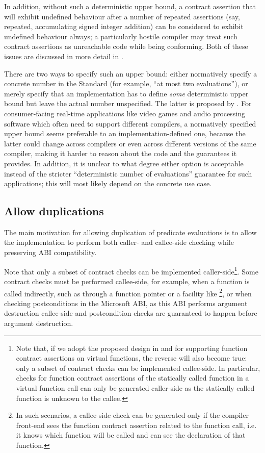 In addition, without such a deterministic upper bound, a contract assertion that will exhibit undefined behaviour after a number of repeated assertions (say, repeated, accumulating signed integer addition) can be considered to exhibit undefined behaviour always; a particularly hostile compiler may treat such contract assertions as unreachable code while being conforming. Both of these issues are discussed in more detail in \cite{P3119R0}.

There are two ways to specify such an upper bound: either normatively specify a concrete number in the Standard (for example, ``at most two evaluations''), or merely specify that an implementation has to define \emph{some} deterministic upper bound but leave the actual number unspecified. The latter is proposed by \cite{P3119R0}. For consumer-facing real-time applications like video games and audio processing software which often need to support different compilers, a normatively specified upper bound seems preferable to an implementation-defined one, because the latter could change across compilers or even across different versions of the same compiler, making it harder to reason about the code and the guarantees it provides. In addition, it is unclear to what degree either option is acceptable instead of the stricter ``deterministic number of evaluations'' guarantee for such applications; this will most likely depend on the concrete use case.

\subsection{Allow duplications}
\label{subsec:ville}

The main motivation for allowing duplication of predicate evaluations is to allow the implementation to perform both caller- and callee-side checking while preserving ABI compatibility.

Note that only a subset of contract checks can be implemented caller-side\footnote{Note that, if we adopt the proposed design in \cite{P3097R0} and \cite{P3165R0} for supporting function contract assertions on virtual functions, the reverse will also become true: only a subset of contract checks can be implemented callee-side. In particular, checks for function contract assertions of the statically called function in a virtual function call can only be generated caller-side as the statically called function is unknown to the callee.}. Some contract checks must be performed callee-side, for example, when a function is called indirectly, such as through a function pointer or a facility like \footnote{In such scenarios, a callee-side check can be generated only if the compiler front-end sees the function contract assertion related to the function call, i.e. it knows which function will be called and can see the declaration of that function.}, or when checking postconditions in the Microsoft ABI, as this ABI performs argument destruction callee-side and postcondition checks are guaranteed to happen before argument destruction. 

